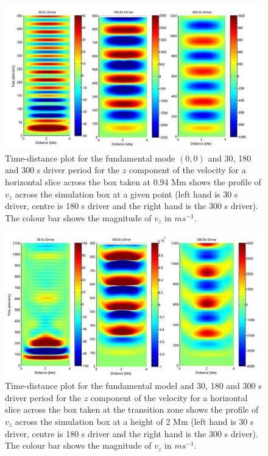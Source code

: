\documentclass[preprint,authoryear,12pt]{elsarticle}
\begin{document}
\begin{figure}[h]
\includegraphics[scale=1]{imrescale/fig3_dt_30_180_300_0_horiz_p94Mm.jpg}
\caption{Time-distance plot for the fundamental mode $(0,0)$  and 30, 180 and 300 s driver period for the $z$ component of the velocity for a horizontal slice across the box  taken at 0.94 Mm shows  the profile of $ v_{z}$ across the simulation box at a given point (left hand is 30 s driver, centre is 180 s driver and the right hand is the 300 s driver). The colour bar shows the magnitude of $v_z$ in $ms^{-1}$.}
\label{Fig4}
\end{figure}
\begin{figure}[h]
\includegraphics[scale=1]{imrescale/fig4_dt_30_180_300_0_horiz_2Mm.jpg}
\caption{Time-distance plot for the fundamental model and 30, 180 and 300 s driver period for the $z$ component of the velocity for a horizontal slice across the box  taken at the transition zone shows  the profile of $v_{z}$ across the simulation box at a height of 2 Mm (left hand is 30 s driver, centre is 180 s driver and the right hand is the 300 s driver). The colour bar shows the magnitude of $v_z$ in $ms^{-1}$.}
\label{Fig5}
\end{figure}
\end{document}
